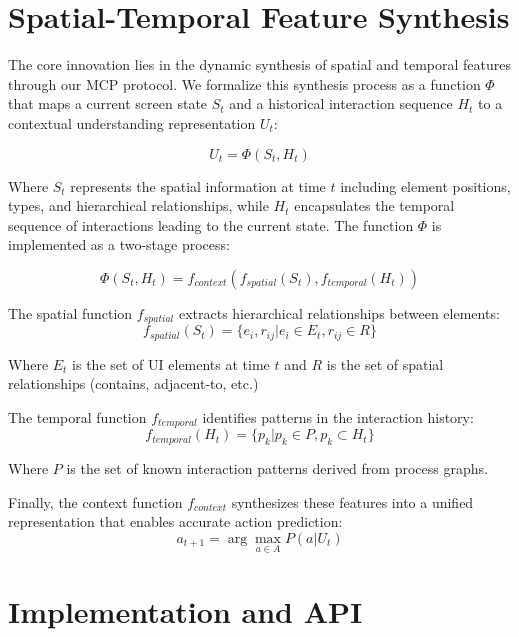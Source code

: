 \documentclass{article}
\begin{document}
\section{Spatial-Temporal Feature Synthesis}

The core innovation lies in the dynamic synthesis of spatial and temporal features through our MCP protocol. We formalize this synthesis process as a function $\Phi$ that maps a current screen state $S_t$ and a historical interaction sequence $H_t$ to a contextual understanding representation $U_t$:

\begin{equation}
U_t = \Phi(S_t, H_t)
\end{equation}

Where $S_t$ represents the spatial information at time $t$ including element positions, types, and hierarchical relationships, while $H_t$ encapsulates the temporal sequence of interactions leading to the current state. The function $\Phi$ is implemented as a two-stage process:

\begin{equation}
\Phi(S_t, H_t) = f_{context}(f_{spatial}(S_t), f_{temporal}(H_t))
\end{equation}

The spatial function $f_{spatial}$ extracts hierarchical relationships between elements:
\begin{equation}
f_{spatial}(S_t) = \{e_i, r_{ij} | e_i \in E_t, r_{ij} \in R\}
\end{equation}

Where $E_t$ is the set of UI elements at time $t$ and $R$ is the set of spatial relationships (contains, adjacent-to, etc.)

The temporal function $f_{temporal}$ identifies patterns in the interaction history:
\begin{equation}
f_{temporal}(H_t) = \{p_k | p_k \in P, p_k \subset H_t\}
\end{equation}

Where $P$ is the set of known interaction patterns derived from process graphs.

Finally, the context function $f_{context}$ synthesizes these features into a unified representation that enables accurate action prediction:
\begin{equation}
a_{t+1} = \arg\max_{a \in A} P(a | U_t)
\end{equation}

\section{Implementation and API}
\end{document}
